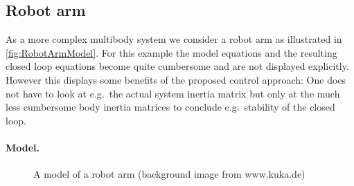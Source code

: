 \subsection{Robot arm}
As a more complex multibody system we consider a robot arm as illustrated in \autoref{fig:RobotArmModel}.
For this example the model equations and the resulting closed loop equations become quite cumbersome and are not displayed explicitly.
However this displays some benefits of the proposed control approach: One does not have to look at e.g.\ the actual system inertia matrix but only at the much less cumbersome body inertia matrices to conclude e.g.\ stability of the closed loop. 

\paragraph{Model.}

\begin{figure}
 \centering
 
 \caption{A model of a robot arm (background image from www.kuka.de)}
 \label{fig:RobotArmModel}
\end{figure}

